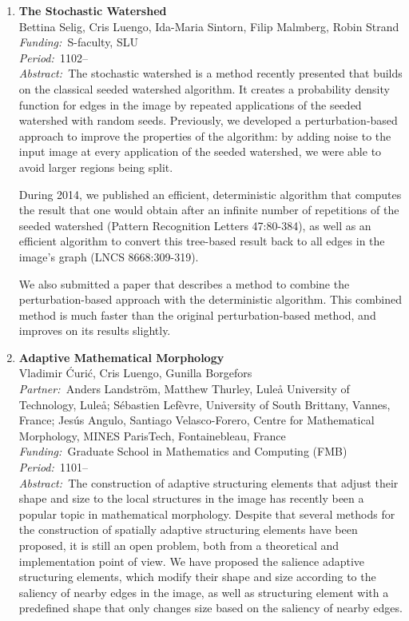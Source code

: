 \documentclass[10pt, a4paper]{article}
\newcommand{\aabstract}[1]{\emph{Abstract:~}#1}
\newcommand{\ffunding}[1]{\emph{Funding:~}#1\\}
\newcommand{\ppartner}[1]{\emph{Partner:~}#1\\}
\newcommand{\pperiod}[1]{\emph{Period:~}#1\\}
\begin{document}
\begin{enumerate}

\item
\label{proj:stochwatershed}
\textbf{The Stochastic Watershed}\\
Bettina Selig, Cris Luengo, Ida-Maria Sintorn, Filip Malmberg, Robin Strand\\
\ffunding{S-faculty, SLU}
\pperiod{1102--}
\aabstract{The stochastic watershed is a method recently presented that builds on the classical seeded watershed algorithm. It creates a probability density function for edges in the image by repeated applications of the seeded watershed with random seeds. Previously, we developed a perturbation-based approach to improve the properties of the algorithm: by adding noise to the input image at every application of the seeded watershed, we were able to avoid larger regions being split.

During 2014, we published an efficient, deterministic algorithm that computes the result that one would obtain after an infinite number of repetitions of the seeded watershed (Pattern Recognition Letters 47:80-384), as well as an efficient algorithm to convert this tree-based result back to all edges in the image's graph (LNCS 8668:309-319).

We also submitted a paper that describes a method to combine the perturbation-based approach with the deterministic algorithm. This combined method is much faster than the original perturbation-based method, and improves on its results slightly.}


\item 
\textbf{Adaptive Mathematical Morphology}\\
Vladimir \' Curi\' c, Cris Luengo, Gunilla Borgefors\\
\ppartner{Anders Landstr\"{o}m, Matthew Thurley, Lule\r{a} University of Technology, Lule\r{a}; S\'{e}bastien Lef\`{e}vre, University of South Brittany, Vannes, France; Jes\'{u}s Angulo, Santiago Velasco-Forero, Centre for Mathematical Morphology, MINES ParisTech, Fontainebleau, France}
\ffunding{Graduate School in Mathematics and Computing (FMB)}
\pperiod{1101--}
\aabstract{The construction of adaptive structuring elements that adjust their shape and size to the local structures in the image has recently been a popular topic in mathematical morphology. Despite that several methods for the construction of spatially adaptive structuring elements have been proposed, it is still an open problem, both from a theoretical and implementation point of view. We have proposed the salience adaptive structuring elements, which modify their shape and size according to the saliency of nearby edges in the image, as well as structuring element with a predefined shape that only changes size based on the saliency of nearby edges.

}
\end{enumerate}
\end{document}
